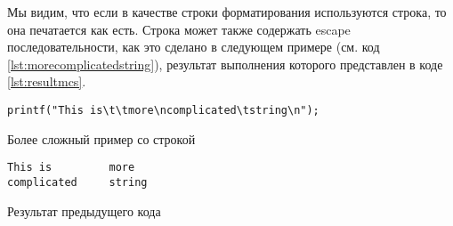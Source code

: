\documentclass[12pt]{article}
\begin{document}
Мы видим, что если в качестве строки форматирования используются строка, то она печатается как есть. Строка может также содержать escape последовательности, как это сделано в следующем примере (см. код \ref{lst:morecomplicatedstring}), результат выполнения которого представлен в коде \ref{lst:resultmcs}.

\begin{listing}[ht]
\begin{center}
\begin{verbatim}
printf("This is\t\tmore\ncomplicated\tstring\n");
\end{verbatim}
\end{center}
\caption{Более сложный пример со строкой}
\label{lst:morecomplicatedstring}
\end{listing}

\begin{listing}[ht]
\begin{center}
\begin{verbatim}
This is         more
complicated     string

\end{verbatim}
\end{center}
\caption{Результат предыдущего кода}
\label{lst:resultmcs}
\end{listing}
\end{document}
